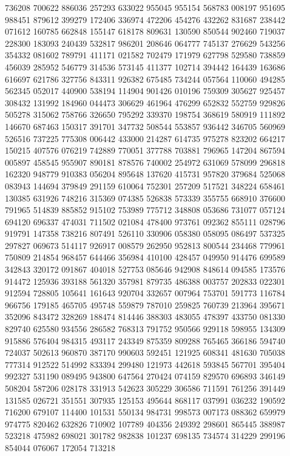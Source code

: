 {736208 700622 886036 257293 633022 955045 955154 568783 008197 951695 988451%
879612 399279 172406 336974 472206 454276 432262 831687 238442 071612 160785%
662848 155147 618178 809631 130590 850544 902460 719037 228300 183093 240439%
532817 986201 208646 064777 745137 276629 543256 354332 081602 789791 411171%
021582 702479 171979 627798 529580 738859 456039 285952 546779 314536 573145%
411377 102714 394442 164439 163686 616697 621786 327756 843311 926382 675485%
734244 057564 110060 494285 562345 052017 440900 538194 114904 901426 010196%
759309 305627 925457 308432 131992 184960 044473 306629 461964 476299 652832%
552759 929826 505278 315062 758766 326650 795292 339370 198754 368619 580919%
111892 146670 687463 150317 391701 347732 508544 553857 936442 346705 560969%
526516 737225 775308 006442 433000 214287 614735 975278 823202 664217 150215%
407576 076219 742889 770051 377788 703881 796965 147204 867594 005897 458545%
955907 890181 878576 740002 254972 631069 578099 296818 162320 948779 910383%
056204 895648 137620 415731 957820 379684 525068 083943 144694 379849 291159%
610064 752301 257209 517521 348224 658461 130385 631926 748216 315369 074385%
526838 573339 355755 668910 376600 791965 514839 885852 915102 753989 775712%
348808 053686 731077 057124 694120 696337 474031 711502 021084 478400 973761%
092362 855111 028796 919791 147358 738216 807491 526110 330906 058380 058095%
086497 537325 297827 069673 514117 926917 008579 262950 952813 800544 234468%
779961 750809 214854 968457 644466 356984 410100 428457 049950 914476 699589%
342843 320172 091867 404018 527753 085646 942908 848614 094585 173576 914472%
125936 393188 561320 357981 879735 486388 003757 202833 022301 912594 728805%
105641 161643 920704 332657 007964 753701 591773 116784 966756 179185 465705%
495748 559879 787010 259825 760739 213964 395671 352096 843472 328269 188474%
814446 388303 483055 478397 433750 081330 829740 625580 934556 286582 768313%
791752 950566 929118 598955 134309 915886 576404 984315 493117 243349 875359%
809288 765465 366186 594740 724037 502613 960870 387170 990603 592451 121925%
608341 481630 705038 777314 912522 514992 833394 299480 121973 442618 593845%
567701 395404 992327 531190 089495 943800 647564 270424 074159 829570 696893%
346149 508204 587206 028178 331913 542623 305229 306586 711591 761256 391449%
131585 026721 351551 307935 125153 495644 868117 037991 036232 190592 716200%
679107 114400 101531 550134 984731 998573 007173 088362 659979 974775 820462%
632826 710902 107789 404356 249392 298601 865445 388987 523218 475982 698021%
301782 982838 101237 698135 734574 314229 299196 854044 076067 172054 713218%
}
